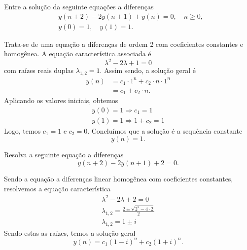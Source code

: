 \begin{exeresol}
  Entre a solução da seguinte equações a diferenças
  \begin{align}
    &y(n+2)-2y(n+1)+y(n) = 0,\quad n\geq 0,\\
    &y(0)=1,\quad y(1)=1.
  \end{align}
\end{exeresol}
\begin{resol}
  Trata-se de uma equação a diferenças de ordem 2 com coeficientes constantes e homogênea. A equação característica associada é
  \begin{equation}
    \lambda^2 - 2\lambda + 1 = 0
  \end{equation}
  com raízes reais duplas $\lambda_{1,2} = 1$. Assim sendo, a solução geral é
  \begin{align}
    y(n) &= c_1\cdot 1^n + c_2\cdot n \cdot 1^n\\
         &= c_1 + c_2\cdot n.
  \end{align}
  Aplicando os valores iniciais, obtemos
  \begin{align}
    y(0)=1 \Rightarrow c_1 = 1\\
    y(1)=1 \Rightarrow 1 + c_2 = 1
  \end{align}
  Logo, temos $c_1=1$ e $c_2=0$. Concluímos que a solução é a sequência constante
  \begin{equation}
    y(n)=1.
  \end{equation}
\end{resol}

\begin{exeresol}
  Resolva a seguinte equação a diferenças
  \begin{equation}
    y(n+2) - 2y(n+1) + 2 = 0.
  \end{equation}
\end{exeresol}
\begin{resol}
  Sendo a equação a diferenças linear homogênea com coeficientes constantes, resolvemos a equação característica
  \begin{gather}
    \lambda^2 - 2\lambda + 2 = 0\\
    \lambda_{1,2} = \frac{2\pm\sqrt{2^2-4\cdot 2}}{2}\\
    \lambda_{1,2} = 1\pm i
  \end{gather}
  Sendo estas as raízes, temos a solução geral
  \begin{equation}
    y(n) = c_1(1-i)^n + c_2(1+i)^n.
  \end{equation}
\end{resol}

